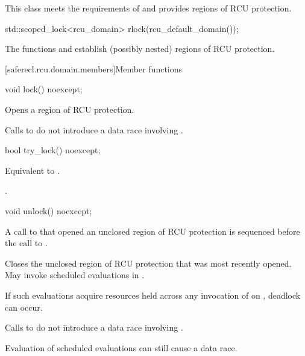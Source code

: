 \pnum
This class meets the requirements of
 and
provides regions of RCU protection.
\begin{example}
\begin{codeblock}
std::scoped_lock<rcu_domain> rlock(rcu_default_domain());
\end{codeblock}
\end{example}

\pnum
The functions  and  establish
(possibly nested) regions of RCU protection.

[saferecl.rcu.domain.members]{Member functions}

%
\begin{itemdecl}
void lock() noexcept;
\end{itemdecl}

\begin{itemdescr}
\pnum
\effects
Opens a region of RCU protection.

\pnum
\remarks
Calls to 
do not introduce a data race involving .
\end{itemdescr}

%
\begin{itemdecl}
bool try_lock() noexcept;
\end{itemdecl}

\begin{itemdescr}
\pnum
\effects
Equivalent to .

\pnum
\returns
{}.
\end{itemdescr}

%
\begin{itemdecl}
void unlock() noexcept;
\end{itemdecl}

\begin{itemdescr}
\pnum
\expects
A call to 
that opened an unclosed region of RCU protection
is sequenced before the call to .

\pnum
\effects
Closes the unclosed region of RCU protection
that was most recently opened.
May invoke scheduled evaluations in .

\pnum
\begin{note}
If such evaluations acquire resources
held across any invocation of  on ,
deadlock can occur.
\end{note}

\pnum
\remarks
Calls to  do not introduce a data race involving .
\begin{note}
Evaluation of scheduled evaluations can still cause a data race.
\end{note}
\end{itemdescr}

